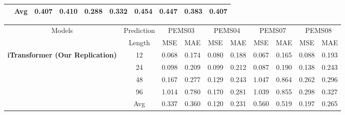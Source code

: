 \documentclass[twoside,12pt]{article}
\begin{document}
\begin{table}[htbp]
{\begin{small}
\begin{tabular}{c|c|cc|cc|cc|cc}
        \cmidrule(lr){2-10}
                                                                 & Avg        & 0.407                      & 0.410                      & 0.288                      & 0.332                      & 0.454 & 0.447 & 0.383 & 0.407 \\
        \bottomrule
      \end{tabular}
    \end{small}
  }
  \resizebox{0.9\textwidth}{!}
  {
    \begin{small}
      \renewcommand{\multirowsetup}{\centering}
      \setlength{\tabcolsep}{5.3pt}
      \begin{tabular}{c|c|cc|cc|cc|cc}
        \toprule
        \multirow{2}{*}{Models}                                  & Prediction & \multicolumn{2}{c|}{PEMS03} & \multicolumn{2}{c|}{PEMS04} & \multicolumn{2}{c|}{PEMS07} & \multicolumn{2}{c|}{PEMS08}                                 \\
        \cmidrule(lr){3-4} \cmidrule(lr){5-6} \cmidrule(lr){7-8} \cmidrule(lr){9-10}
                                                                 & Length     & MSE                         & MAE                         & MSE                         & MAE                         & MSE   & MAE   & MSE   & MAE   \\
        \midrule
        \multirow{5}{*}{\textbf{iTransformer (Our Replication)}} & 12         & 0.068                       & 0.174                       & 0.080                       & 0.188                       & 0.067 & 0.165 & 0.088 & 0.193 \\
                                                                 & 24         & 0.098                       & 0.209                       & 0.099                       & 0.212                       & 0.087 & 0.190 & 0.138 & 0.243 \\
                                                                 & 48         & 0.167                       & 0.277                       & 0.129                       & 0.243                       & 1.047 & 0.864 & 0.262 & 0.296 \\
                                                                 & 96         & 1.014                       & 0.780                       & 0.170                       & 0.281                       & 1.039 & 0.855 & 0.298 & 0.327 \\
        \cmidrule(lr){2-10}
                                                                 & Avg        & 0.337                       & 0.360                       & 0.120                       & 0.231                       & 0.560 & 0.519 & 0.197 & 0.265 \\

\end{tabular}
\end{small}}
\end{table}
\end{document}
